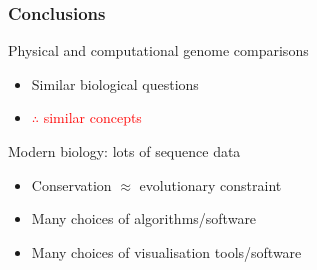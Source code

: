 %
\begin{frame}
  \frametitle{Conclusions}
  \textcolor{RawSienna}{Physical and computational genome comparisons} \\
  \begin{itemize}
    \item Similar biological questions
    \item \textcolor{red}{$\therefore$ similar concepts}
  \end{itemize}  
  \textcolor{hutton_green}{Modern biology: lots of sequence data}
  \begin{itemize}
    \item Conservation $\approx$ evolutionary constraint
    \item \textcolor{hutton_blue}{Many choices of algorithms/software}
    \item \textcolor{hutton_purple}{Many choices of visualisation tools/software}
  \end{itemize}  
\end{frame}
